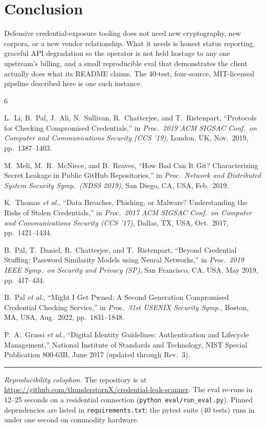 \documentclass[conference]{IEEEtran}
\begin{document}
\section{Conclusion}
Defensive credential-exposure tooling does not need new cryptography,
new corpora, or a new vendor relationship. What it needs is honest
status reporting, graceful API degradation so the operator is not
held hostage to any one upstream's billing, and a small reproducible
eval that demonstrates the client actually does what its README
claims. The 40-test, four-source, MIT-licensed pipeline described
here is one such instance.


\begin{thebibliography}{6}

L.~Li, B.~Pal, J.~Ali, N.~Sullivan, R.~Chatterjee, and T.~Ristenpart,
``Protocols for Checking Compromised Credentials,'' in
\emph{Proc.\ 2019 ACM SIGSAC Conf.\ on Computer and Communications
Security (CCS '19)}, London, UK, Nov.\ 2019, pp.\ 1387--1403.

M.~Meli, M.~R.~McNiece, and B.~Reaves, ``How Bad Can It Git?
Characterizing Secret Leakage in Public GitHub Repositories,'' in
\emph{Proc.\ Network and Distributed System Security Symp.\ (NDSS
2019)}, San Diego, CA, USA, Feb.\ 2019.

K.~Thomas \emph{et al.}, ``Data Breaches, Phishing, or Malware?
Understanding the Risks of Stolen Credentials,'' in
\emph{Proc.\ 2017 ACM SIGSAC Conf.\ on Computer and Communications
Security (CCS '17)}, Dallas, TX, USA, Oct.\ 2017, pp.\ 1421--1434.

B.~Pal, T.~Daniel, R.~Chatterjee, and T.~Ristenpart, ``Beyond
Credential Stuffing: Password Similarity Models using Neural
Networks,'' in \emph{Proc.\ 2019 IEEE Symp.\ on Security and Privacy
(SP)}, San Francisco, CA, USA, May 2019, pp.\ 417--434.

B.~Pal \emph{et al.}, ``Might I Get Pwned: A Second Generation
Compromised Credential Checking Service,'' in
\emph{Proc.\ 31st USENIX Security Symp.}, Boston, MA, USA,
Aug.\ 2022, pp.\ 1831--1848.

P.~A.~Grassi \emph{et al.}, ``Digital Identity Guidelines:
Authentication and Lifecycle Management,'' National Institute of
Standards and Technology, NIST Special Publication 800-63B, June 2017
(updated through Rev.~3).

\end{thebibliography}

\vspace{2mm}
\noindent\rule{\linewidth}{0.4pt}

\noindent\textit{Reproducibility colophon.} The repository is at
\url{https://github.com/thunderstornX/credential-leak-scanner}. The
eval re-runs in 12--25 seconds on a residential connection
(\texttt{python eval/run\_eval.py}). Pinned dependencies are listed
in \texttt{requirements.txt}; the pytest suite (40 tests) runs in
under one second on commodity hardware.
\end{document}
